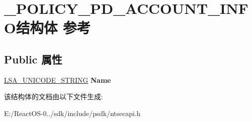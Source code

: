 \hypertarget{struct___p_o_l_i_c_y___p_d___a_c_c_o_u_n_t___i_n_f_o}{}\section{\+\_\+\+P\+O\+L\+I\+C\+Y\+\_\+\+P\+D\+\_\+\+A\+C\+C\+O\+U\+N\+T\+\_\+\+I\+N\+F\+O结构体 参考}
\label{struct___p_o_l_i_c_y___p_d___a_c_c_o_u_n_t___i_n_f_o}
\subsection*{Public 属性}
\begin{DoxyCompactItemize}
\item 
\mbox{\label{struct___p_o_l_i_c_y___p_d___a_c_c_o_u_n_t___i_n_f_o_a194ff130660413a5b18cccc01ec67732}} 
\hyperlink{struct___l_s_a___u_n_i_c_o_d_e___s_t_r_i_n_g}{L\+S\+A\+\_\+\+U\+N\+I\+C\+O\+D\+E\+\_\+\+S\+T\+R\+I\+NG} {\bfseries Name}
\end{DoxyCompactItemize}


该结构体的文档由以下文件生成\+:\begin{DoxyCompactItemize}
\item 
E\+:/\+React\+O\+S-\/0../sdk/include/psdk/ntsecapi.\+h\end{DoxyCompactItemize}
